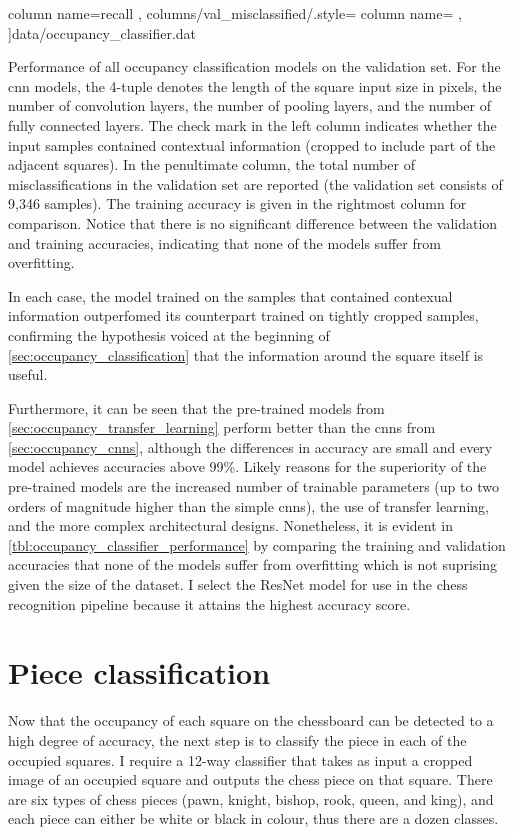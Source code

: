 \documentclass[../report.tex]{subfiles}
\begin{document}
\begin{table}
{{                column name={recall}
            },
            columns/val_misclassified/.style={
                column name={}
            },
        ]{data/occupancy_classifier.dat}
    }
    \caption[Performance of all occupancy classification models on the validation set.]{
        Performance of all occupancy classification models on the validation set.
        For the \gls{cnn} models, the 4-tuple denotes the length of the square input size in pixels, the number of convolution layers, the number of pooling layers, and the number of fully connected layers.
        The check mark in the left column indicates whether the input samples contained contextual information (cropped to include part of the adjacent squares).
        In the penultimate column, the total number of misclassifications in the validation set are reported (the validation set consists of 9,346 samples).
        The training accuracy is given in the rightmost column for comparison.
        Notice that there is no significant difference between the validation and training accuracies, indicating that none of the models suffer from overfitting.
    }
    \label{tbl:occupancy_classifier_performance}
\end{table}
In each case, the model trained on the samples that contained contexual information outperfomed its counterpart trained on tightly cropped samples, confirming the hypothesis voiced at the beginning of \cref{sec:occupancy_classification} that the information around the square itself is useful.

Furthermore, it can be seen that the pre-trained models from \cref{sec:occupancy_transfer_learning} perform better than the \glspl{cnn} from \cref{sec:occupancy_cnns}, although the differences in accuracy are small and every model achieves accuracies above 99\%.
Likely reasons for the superiority of the pre-trained models are the increased number of trainable parameters (up to two orders of magnitude higher than the simple \glspl{cnn}), the use of transfer learning, and the more complex architectural designs.
Nonetheless, it is evident in \cref{tbl:occupancy_classifier_performance} by comparing the training and validation accuracies that none of the models suffer from overfitting which is not suprising given the size of the dataset.
I select the ResNet model for use in the chess recognition pipeline because it attains the highest accuracy score.


\section{Piece classification}
\label{sec:piece_classification}
Now that the occupancy of each square on the chessboard can be detected to a high degree of accuracy, the next step is to classify the piece in each of the occupied squares.
I require a 12-way classifier that takes as input a cropped image of an occupied square and outputs the chess piece on that square. 
There are six types of chess pieces (pawn, knight, bishop, rook, queen, and king), and each piece can either be white or black in colour, thus there are a dozen classes.
\end{document}

